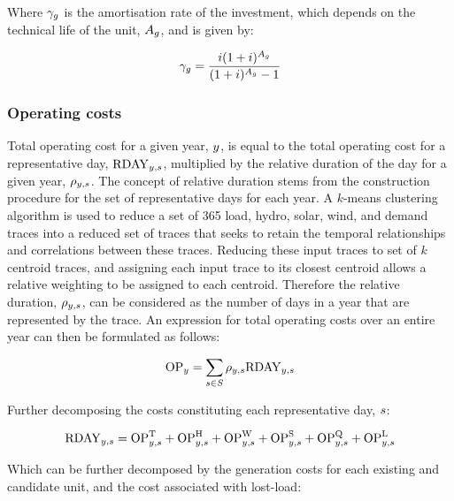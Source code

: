 \documentclass{article}
\begin{document}
Where $\cAmortisationRate$ is the amortisation rate of the investment, which depends on the technical life of the unit, $\cAssetLifetime$, and is given by:

\begin{equation}
\cAmortisationRate = \frac{\cInterestRate(1+\cInterestRate)^{\cAssetLifetime}}{(1+\cInterestRate)^{\cAssetLifetime} - 1}
\end{equation}


\subsubsection{Operating costs}

Total operating cost for a given year, $\iYear$, is equal to the total operating cost for a representative day, $\cOperatingCostScenario$, multiplied by the relative duration of the day for a given year, $\cScenarioDuration$. The concept of relative duration stems from the construction procedure for the set of representative days for each year. A $k$-means clustering algorithm is used to reduce a set of 365 load, hydro, solar, wind, and demand traces into a reduced set of traces that seeks to retain the temporal relationships and correlations between these traces. Reducing these input traces to set of $k$ centroid traces, and assigning each input trace to its closest centroid allows a relative weighting to be assigned to each centroid. Therefore the relative duration, $\cScenarioDuration$, can be considered as the number of days in a year that are represented by the trace. An expression for total operating costs over an entire year can then be formulated as follows:

\begin{equation}
\cOperatingCost[\iYear] = \sum\limits_{\iScenario \in \sScenarios} \cScenarioDuration \cOperatingCostScenario
\end{equation}

Further decomposing the costs constituting each representative day, $\iScenario$:

\begin{equation}
\cOperatingCostScenario = \cOperatingCostThermal + \cOperatingCostHydro + \cOperatingCostWind + \cOperatingCostSolar + \cOperatingCostStorage + \cOperatingCostLostLoad
\end{equation}

Which can be further decomposed by the generation costs for each existing and candidate unit, and the cost associated with lost-load:
\end{document}
